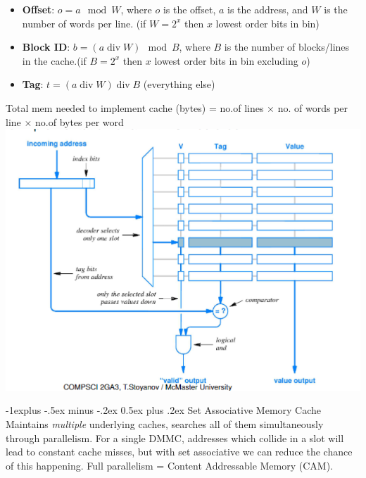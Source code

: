 \documentclass[letterpaper, 8pt]{extarticle}
\makeatletter
\renewcommand{\subsection}{\@startsection{subsection}{2}{0mm}%
                                {-1explus -.5ex minus -.2ex}%
                                {0.5ex plus .2ex}%
                                {\normalfont\small\bfseries}}
\DeclareMathOperator{\divv}{div}
\makeatother
\begin{document}
\begin{multicols*}{6}
    \begin{itemize}
        \item \textbf{Offset}: $o = a \mod W$, where $o$ is the offset, $a$ is the address, and $W$ is the number of words per line. (if $W = 2^x$ then $x$ lowest order bits in bin)
        \item \textbf{Block ID}: $b = (a \divv W) \mod B$, where $B$ is the number of blocks/lines in the cache.(if $B = 2^x$ then $x$ lowest order bits in bin excluding $o$)
        \item \textbf{Tag}: $t = (a \divv W) \divv B$ (everything else)
    \end{itemize}
    Total mem needed to implement cache (bytes) = no.of lines $\times$ no. of words per line $\times$ no.of bytes per word
    \includegraphics[width=\linewidth]{DMMC_hardware.png}

    \subsection{Set Associative Memory Cache}
    Maintains \textit{multiple} underlying caches, searches all of them simultaneously through parallelism.
    For a single DMMC, addresses which collide in a slot will lead to constant cache misses, but with set associative we can reduce the chance of this happening.
    Full parallelism = Content Addressable Memory (CAM).


\end{multicols*}
\end{document}
